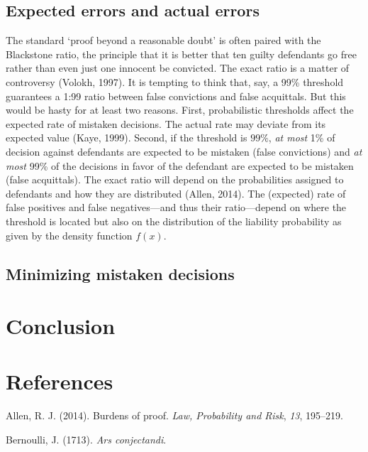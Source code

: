 \documentclass[10pt,dvipsnames]{scrartcl}
\begin{document}
\subsection{Expected errors and actual
errors}\label{expected-errors-and-actual-errors}

The standard `proof beyond a reasonable doubt' is often paired with the
Blackstone ratio, the principle that it is better that ten guilty
defendants go free rather than even just one innocent be convicted. The
exact ratio is a matter of controversy (Volokh, 1997). It is tempting to
think that, say, a 99\% threshold guarantees a 1:99 ratio between false
convictions and false acquittals. But this would be hasty for at least
two reasons. First, probabilistic thresholds affect the expected rate of
mistaken decisions. The actual rate may deviate from its expected value
(Kaye, 1999). Second, if the threshold is \(99\%\), \textit{at most} 1\%
of decision against defendants are expected to be mistaken (false
convictions) and \textit{at most} 99\% of the decisions in favor of the
defendant are expected to be mistaken (false acquittals). The exact
ratio will depend on the probabilities assigned to defendants and how
they are distributed (Allen, 2014). The (expected) rate of false
positives and false negatives---and thus their ratio---depend on where
the threshold is located but also on the distribution of the liability
probability as given by the density function \(f(x)\).

\subsection{Minimizing mistaken
decisions}\label{minimizing-mistaken-decisions}

\section{Conclusion}\label{conclusion-1}

\section*{References}\label{references}

\hypertarget{refs}{}
\hypertarget{ref-allen2014}{}
Allen, R. J. (2014). Burdens of proof. \emph{Law, Probability and Risk},
\emph{13}, 195--219.

\hypertarget{ref-Bernoulli1713Ars-conjectandi}{}
Bernoulli, J. (1713). \emph{Ars conjectandi}.
\end{document}
